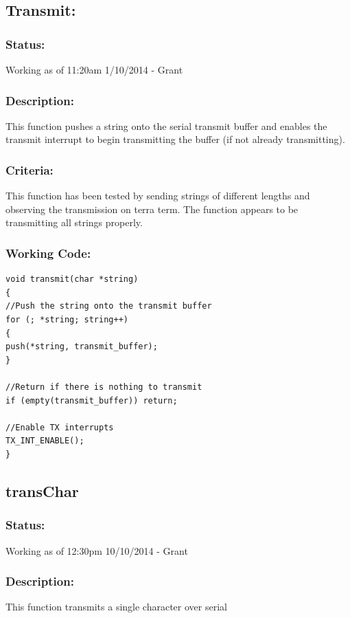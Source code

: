 \documentclass[]{report}
\begin{document}
\subsection{Transmit:}
\subsubsection{Status:}
Working as of 11:20am 1/10/2014 - Grant

\subsubsection{Description:}
This function pushes a string onto the serial transmit buffer and enables the transmit interrupt to begin transmitting the buffer (if not already transmitting).

\subsubsection{Criteria:}
This function has been tested by sending strings of different lengths and observing the transmission on terra term. The function appears to be transmitting all strings properly.

\subsubsection{Working Code:}
\begin{lstlisting}
void transmit(char *string)
{
//Push the string onto the transmit buffer
for (; *string; string++)
{
push(*string, transmit_buffer);
}

//Return if there is nothing to transmit
if (empty(transmit_buffer)) return;

//Enable TX interrupts
TX_INT_ENABLE();
}
\end{lstlisting}

\subsection{transChar}
\subsubsection{Status:}
Working as of 12:30pm 10/10/2014 - Grant

\subsubsection{Description:}
This function transmits a single character over serial
\end{document}
